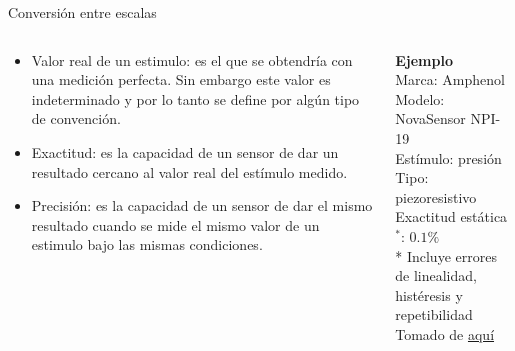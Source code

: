 \documentclass[aspectratio=169]{beamer}
\begin{document}
\begin{frame}{Conversión entre escalas}
    \begin{columns}[c, onlytextwidth]
        \begin{column}{0.55\textwidth}
            \begin{itemize}
                \item Valor real de un estimulo: es el que se obtendría con una medición perfecta. Sin embargo este valor es indeterminado y por lo tanto se define por algún tipo de convención. 
                \item Exactitud: es la capacidad de un sensor de dar un resultado cercano al valor real del estímulo medido.
                \item Precisión: es la capacidad de un sensor de dar el mismo resultado cuando se mide el mismo valor de un estimulo bajo las mismas condiciones. 
            \end{itemize}
        \end{column}
        \begin{column}{0.40\textwidth}
            \textbf{Ejemplo}\\[4pt]
            Marca: Amphenol\\[4pt]
            Modelo: NovaSensor NPI-19\\[4pt]
            Estímulo: presión\\[4pt]
            Tipo: piezoresistivo\\[4pt]
            Exactitud estática$^*$: $0.1 \%$ \\[10pt]
            \tiny{* Incluye errores de linealidad, histéresis y repetibilidad}\\
            \tiny{Tomado de \href{https://f.hubspotusercontent40.net/hubfs/9035299/Product\%20Documents/AAS-920-298B-NovaSensor\%20NPI-19-REVISED-061714-web\%20(1).pdf}{aquí}}
        \end{column}
    \end{columns}
\end{frame}
\end{document}
